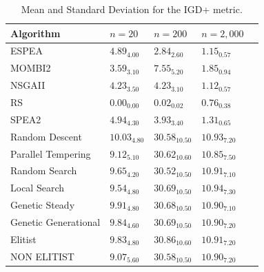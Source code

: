 \begin{table}[H]
    \centering
    {%
    \begin{tabular}{lllll}
    \hline
    Algorithm & $n=20$ & $n=200$ & $n=2,000$ \\
    \hline
    ESPEA                & $  4.89_{ 4.00}$                   & \cellcolor{gray25}$  2.84_{ 2.60}$ & $  1.15_{ 0.57}$                  \\
    MOMBI2                & \cellcolor{gray25}$  3.59_{ 3.10}$ & $ 7.55_{ 5.20}$                    & $  1.85_{ 0.94}$                 \\
    NSGAII               & $  4.23_{3.50}$                   & $  4.23_{ 3.10}$                    & \cellcolor{gray25}$  1.12_{0.57}$ \\
    RS                   & \cellcolor{gray95}$ 0.00_{ 0.00}$ & \cellcolor{gray95}$  0.02_{0.02}$   & \cellcolor{gray95}$  0.76_{0.38}$ \\
    SPEA2                & $  4.94_{4.30}$                   & $   3.93_{3.40}$                    & $  1.31_{0.65}$                   \\
    Random Descent       & $  10.03_{4.80}$                  & $  30.58_{10.50}$                   & $  10.93_{7.20}$                  \\
    Parallel Tempering   & $  9.12_{5.10}$                   & $  30.62_{10.60}$                   & $  10.85_{7.50}$                  \\
    Random Search        & $  9.65_{4.20}$                   & $  30.52_{10.50}$                   & $  10.91_{7.10}$                  \\
    Local Search         & $  9.54_{4.80}$                   & $  30.69_{10.50}$                   & $  10.94_{7.30}$                  \\
    Genetic Steady       & $  9.91_{4.80}$                   & $  30.68_{10.50}$                   & $  10.90_{7.10}$                  \\
    Genetic Generational & $  9.84_{4.60}$                   & $  30.69_{10.50}$                   & $  10.90_{7.20}$                  \\
    Elitist              & $  9.83_{4.80}$                   & $  30.86_{10.60}$                   & $  10.91_{7.20}$                  \\
    NON ELITIST          & $  9.07_{5.60}$                   & $  30.58_{10.50}$                   & $  10.90_{7.20}$                  \\                
    \hline
    \end{tabular}%
    }
    \caption{Mean and Standard Deviation for the IGD+ metric.}
    \label{tab:me_std_both_igdp}
\end{table}
    
